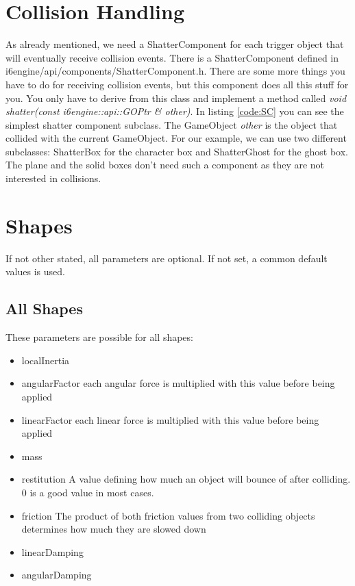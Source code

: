 \documentclass{article}
\begin{document}
\section{Collision Handling}

As already mentioned, we need a ShatterComponent for each trigger object that will eventually receive collision events. There is a ShatterComponent defined in i6engine/api/components/ShatterComponent.h. There are some more things you have to do for receiving collision events, but this component does all this stuff for you. You only have to derive from this class and implement a method called \textit{void shatter(const i6engine::api::GOPtr \& other)}. In listing \ref{code:SC} you can see the simplest shatter component subclass. The GameObject \textit{other} is the object that collided with the current GameObject. For our example, we can use two different subclasses: ShatterBox for the character box and ShatterGhost for the ghost box. The plane and the solid boxes don't need such a component as they are not interested in collisions.


\section{Shapes}\label{note:shapes}

If not other stated, all parameters are optional. If not set, a common default values is used.

\subsection{All Shapes}

These parameters are possible for all shapes:
\begin{itemize}
	\item localInertia
	\item angularFactor each angular force is multiplied with this value before being applied
	\item linearFactor each linear force is multiplied with this value before being applied
	\item mass
	\item restitution A value defining how much an object will bounce of after colliding. 0 is a good value in most cases.
	\item friction The product of both friction values from two colliding objects determines how much they are slowed down
	\item linearDamping
	\item angularDamping
\end{itemize}
\end{document}
